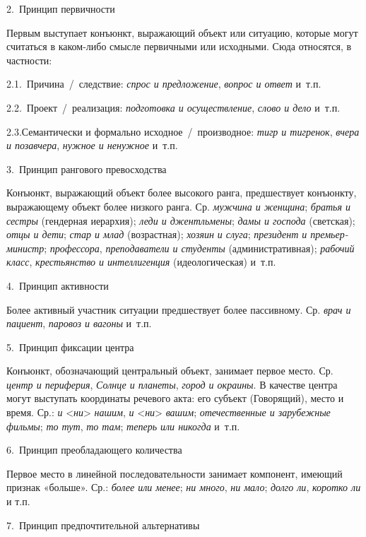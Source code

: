 2.~Принцип первичности

Первым выступает конъюнкт, выражающий объект или ситуацию, которые могут
считаться в каком-либо смысле первичными или исходными. Сюда относятся,
в частности:

2.1.~Причина~/~следствие: \textit{спрос и предложение}, \textit{вопрос и
ответ} и~т.п.

2.2.~Проект~/~реализация: \textit{подготовка и осуществление}, \textit{слово
и дело} и~т.п.

2.3.Семантически и формально исходное~/~производное: \textit{тигр и
тигренок}, \textit{вчера и позавчера}, \textit{нужное и ненужное} и~т.п.

3.~Принцип рангового превосходства

Конъюнкт, выражающий объект более высокого ранга, предшествует
конъюнкту, выражающему объект более низкого ранга. Ср. \textit{мужчина и
женщина}; \textit{братья и сестры} (гендерная иерархия); \textit{леди и
джентльмены}; \textit{дамы и господа} (светская); \textit{отцы и дети};
\textit{стар и млад} (возрастная); \textit{хозяин и слуга}; \textit{президент
и премьер-министр}; \textit{профессора}, \textit{преподаватели и студенты}
(административная); \textit{рабочий класс}, \textit{крестьянство и
интеллигенция} (идеологическая) и~т.п.

4.~Принцип активности

Более активный участник ситуации предшествует более пассивному. Ср.
\textit{врач и пациент}, \textit{паровоз и вагоны} и~т.п.

5.~Принцип фиксации центра

Конъюнкт, обозначающий центральный объект, занимает первое место. Ср.
\textit{центр и периферия}, \textit{Солнце и планеты}, \textit{город и
окраины}. В качестве центра могут выступать координаты речевого акта:
его субъект (Говорящий), место и время. Ср.: \textit{и}
\textless{}\textit{ни}\textgreater{} \textit{нашим}, \textit{и}
\textless{}\textit{ни}\textgreater{} \textit{вашим}; \textit{отечественные и
зарубежные фильмы}; \textit{то тут}, \textit{то там}; \textit{теперь или
никогда} и~т.п.

6.~Принцип преобладающего количества

Первое место в линейной последовательности занимает компонент, имеющий
признак «больше». Ср.: \textit{более или менее}; \textit{ни много}, \textit{ни
мало}; \textit{долго ли}, \textit{коротко ли} и т.п.

7.~Принцип предпочтительной альтернативы

